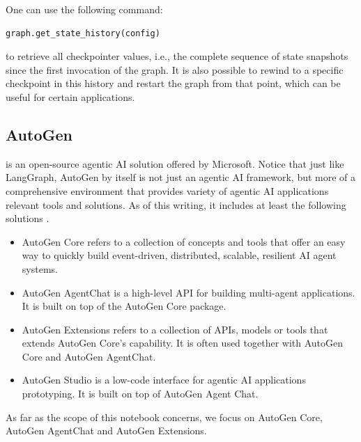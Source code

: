 One can use the following command:
\begin{lstlisting}
graph.get_state_history(config)
\end{lstlisting}
to retrieve all checkpointer values, i.e., the complete sequence of state snapshots since the first invocation of the graph. It is also possible to rewind to a specific checkpoint in this history and restart the graph from that point, which can be useful for certain applications.

\subsection{AutoGen}

 is an open-source agentic AI solution offered by Microsoft. Notice that just like LangGraph, AutoGen by itself is not just an agentic AI framework, but more of a comprehensive environment that provides variety of agentic AI applications relevant tools and solutions. As of this writing, it includes at least the following solutions \cite{autogen2025}.

\begin{itemize}
	\item {}
	
	AutoGen Core refers to a collection of concepts and tools that offer an easy way to quickly build event-driven, distributed, scalable, resilient AI agent systems.
	
	\item {} 
	
	AutoGen AgentChat is a high-level API for building multi-agent applications. It is built on top of the AutoGen Core package.
	
	\item {}
	
	AutoGen Extensions refers to a collection of APIs, models or tools that extends AutoGen Core's capability. It is often used together with AutoGen Core and AutoGen AgentChat.
	
	\item {}
	
	AutoGen Studio is a low-code interface for agentic AI applications prototyping. It is built on top of AutoGen Agent Chat.
	
\end{itemize}

As far as the scope of this notebook concerns, we focus on AutoGen Core, AutoGen AgentChat and AutoGen Extensions.

